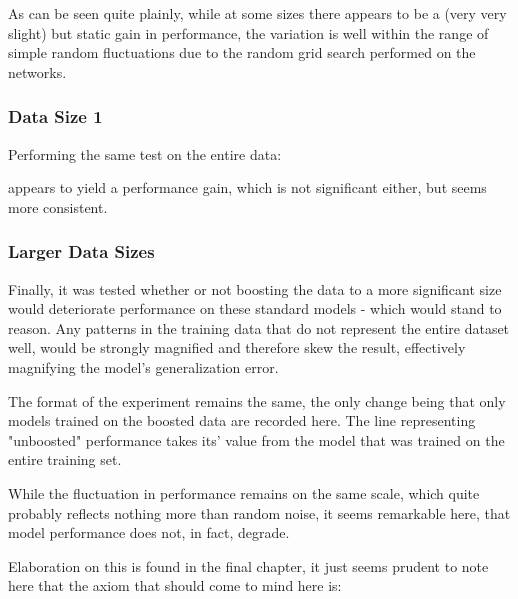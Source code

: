 \pagebreak

As can be seen quite plainly, while at some sizes there appears to be a (very very slight) but static gain in performance, 
the variation is well within the range of simple random fluctuations due to the random grid search performed on the networks.

\clearpage

\subsubsection{Data Size 1}

Performing the same test on the entire data:


appears to yield a performance gain, which is not significant either, but seems more consistent.


\clearpage


\subsubsection{Larger Data Sizes}

Finally, it was tested whether or not boosting the data to a more significant size would deteriorate performance on these standard models - which would stand to reason.
Any patterns in the training data that do not represent the entire dataset well, would be strongly magnified and therefore skew the result, effectively magnifying the model's generalization error.


The format of the experiment remains the same, the only change being that only models trained on the boosted data are recorded here.
The line representing "unboosted" performance takes its' value from the model that was trained on the entire training set.

\clearpage

While the fluctuation in performance remains on the same scale, which quite probably reflects nothing more than random noise, it seems remarkable here, that model performance does not, in fact, degrade.

Elaboration on this is found in the final chapter, it just seems prudent to note here that the axiom that should come to mind here is:

